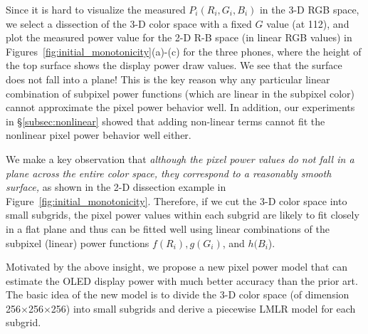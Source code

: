 Since it is hard to visualize the measured $P_i(R_i, G_i,B_i)$ in the
3-D RGB space, we select a dissection of the 3-D color space with a fixed
$G$ value (at 112), and plot the measured power value for the 2-D R-B space (in
linear RGB values) in Figures~\ref{fig:initial_monotonicity}(a)-(c) for
the three phones, where the height of the top surface shows the display power
draw values.  We see that the surface does not fall into a plane! This is
the key reason why any particular linear combination of subpixel power functions
(which are linear in the subpixel color) cannot approximate
the pixel power behavior well. In addition,
our experiments in \S\ref{subsec:nonlinear} showed
that adding non-linear terms cannot fit the nonlinear pixel power behavior well either.

We make a key observation that {\em although the pixel power values do not
fall in a plane across the entire color space, they correspond to a reasonably smooth surface,}
\eg as shown in the 2-D dissection example in Figure~\ref{fig:initial_monotonicity}. 
Therefore, if we cut the 3-D color space into small subgrids, the
pixel power values within each subgrid are likely to fit closely in
a flat plane and thus can be fitted well using linear combinations
of the subpixel (linear) power functions $f(R_{i}), g(G_i)$, and $h(B_i$).

Motivated by the above insight, we propose a new pixel power model
that can estimate the OLED display power with much better accuracy
than the prior art.  The basic idea of the new model is to divide the 3-D
color space (of dimension 256$\times$256$\times$256) into small subgrids
and derive a piecewise LMLR model for each subgrid.



